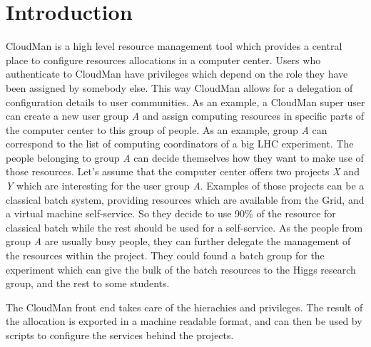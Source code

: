 \section{Introduction}
CloudMan is a high level resource management tool which provides a central place to configure resources allocations in a computer center. Users who authenticate to CloudMan have privileges which depend on the role they have been assigned by somebody else. This way CloudMan allows for a delegation of configuration details to user communities. As an example, a CloudMan super user can create a new user group {\it A} and assign computing resources in specific parts of the computer center to this group of people. As an example, group {\it A} can correspond to the list of computing coordinators of a big LHC experiment. 
The people belonging to group {\it A} can decide themselves how they want to make use of those resources. Let's assume that the computer center offers two projects {\it X} and {\it Y} which are interesting for the user group {\it A}. Examples of those projects can be a classical batch system, providing resources which are available from the Grid, and a virtual machine self-service. So they decide to use 90\% of the resource for classical batch while the rest should be used for a self-service. 
As the people from group {\it A} are usually busy people, they can further delegate the  management of the resources within the project. They could found a batch group for the experiment which can give the bulk of the batch resources to the Higgs research group, and the rest to some students. 

The CloudMan front end takes care of the hierachies and privileges. The result of the allocation is exported in a machine readable format, and can then be used by scripts to configure the services behind the projects. 
